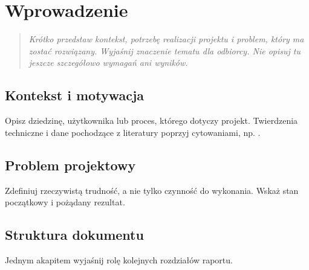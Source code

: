 \chapter{Wprowadzenie}
\label{chap:wprowadzenie}

\begin{quote}\itshape
Krótko przedstaw kontekst, potrzebę realizacji projektu i problem, który ma zostać rozwiązany. Wyjaśnij znaczenie tematu dla odbiorcy. Nie opisuj tu jeszcze szczegółowo wymagań ani wyników.
\end{quote}

\section{Kontekst i motywacja}
Opisz dziedzinę, użytkownika lub proces, którego dotyczy projekt. Twierdzenia techniczne i dane pochodzące z literatury poprzyj cytowaniami, np. \cite{lamport1994}.

\section{Problem projektowy}
Zdefiniuj rzeczywistą trudność, a nie tylko czynność do wykonania. Wskaż stan początkowy i pożądany rezultat.

\section{Struktura dokumentu}
Jednym akapitem wyjaśnij rolę kolejnych rozdziałów raportu.
